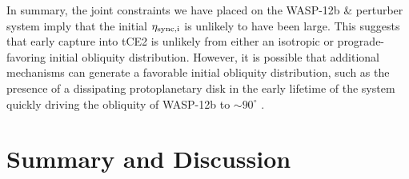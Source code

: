 \documentclass[
        fleqn,
        usenatbib,
    ]{mnras}
\begin{document}
In summary, the joint constraints we have placed on the WASP-12b \& perturber
system imply that the initial $\eta_{\rm sync, i}$ is unlikely to have been
large. This suggests that early capture into tCE2 is unlikely from either an
isotropic or prograde-favoring initial obliquity distribution. However, it is
possible that additional mechanisms can generate a favorable initial obliquity
distribution, such as the presence of a dissipating protoplanetary disk in the
early lifetime of the system quickly driving the obliquity of WASP-12b to $\sim
90^\circ$ \citep{millholland_disk, su2020}.

\section{Summary and Discussion}\label{s:summary}
\end{document}
